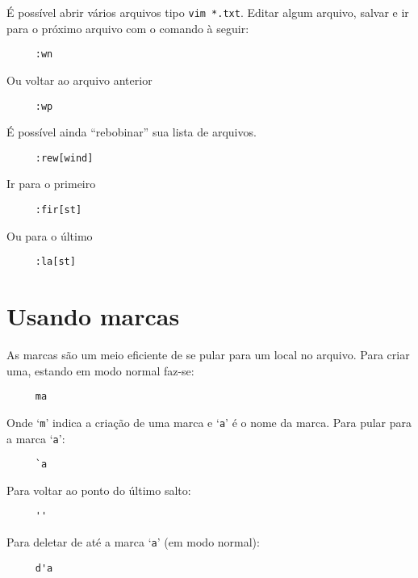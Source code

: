 É possível abrir vários arquivos tipo \verb|vim *.txt|. Editar
algum arquivo, salvar e ir para o próximo arquivo com o comando à
seguir:

\begin{verbatim}
     :wn
\end{verbatim}

Ou voltar ao arquivo anterior

\begin{verbatim}
     :wp
\end{verbatim}

É possível ainda ``rebobinar'' sua lista de arquivos.

\begin{verbatim}
     :rew[wind]
\end{verbatim}

Ir para o primeiro

\begin{verbatim}
     :fir[st]
\end{verbatim}

Ou para o último

\begin{verbatim}
     :la[st]
\end{verbatim}

\section{Usando marcas}
\label{sec:UsandoMarcas}

As marcas são um meio eficiente de se pular para um local no arquivo. Para
criar uma,  estando em modo normal faz-se:

\begin{verbatim}
     ma
\end{verbatim}

Onde `{\tt m}' indica a criação de uma marca e `{\tt a}' é o nome da marca.
Para pular para a marca `{\tt a}':

\begin{verbatim}
     `a
\end{verbatim}

Para voltar ao ponto do último salto:

\begin{verbatim}
     ''
\end{verbatim}

Para deletar de até a marca `{\tt a}' (em modo normal):

\begin{verbatim}
     d'a
\end{verbatim}

